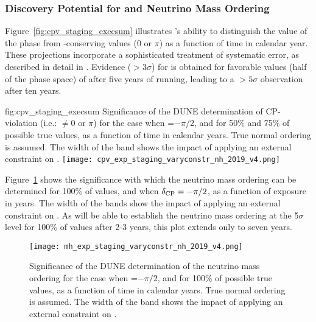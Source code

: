 \subsubsection{Discovery Potential for  and Neutrino 
Mass Ordering}

Figure~\ref{fig:cpv_staging_execsum} 
illustrates 's ability to distinguish 
the value of the  phase \deltacp from -conserving 
values (0 or $\pi$) as a function of time in calendar year.  
These projections incorporate a sophisticated treatment of systematic 
error, as described in detail in \physchlbl.  
Evidence ($>3\sigma$) for  is obtained for 
favorable values (half of the phase space) of \deltacp after five 
years of running, leading to a $>5\sigma$ %
observation after ten years.

\begin{dunefigure}{fig:cpv_staging_execsum}
{Significance of the DUNE determination of CP-violation (i.e.: \deltacp 
$\neq 0$ or $\pi$) for the case when \deltacp=$-\pi/2$, and for 50\% and 
75\% of possible true \deltacp values, as a function of time in calendar 
years. True normal ordering is assumed. The width of the band shows the 
impact of applying an external constraint on .}
\texttt{[image: cpv\_exp\_staging\_varyconstr\_nh\_2019\_v4.png]}
\end{dunefigure}

Figure~\ref{fig:mh_staging} shows the significance
with which the neutrino mass ordering can be determined for 100\% of \deltacp values, and when $\delta_{\rm CP}=-\pi/2$, as a function of exposure in years. The width of the bands show the impact of applying an external constraint on . As  will be able to establish the neutrino mass ordering at the 5$\sigma$ level for 100\% of \deltacp values after 2-3 years, this plot extends only to seven years.

\begin{figure}[h!]
    \centering
	\texttt{[image: mh\_exp\_staging\_varyconstr\_nh\_2019\_v4.png]}	
	\caption[Significance of the DUNE neutrino mass ordering determination, as a function of time]{Significance of the DUNE determination of the neutrino mass ordering for the case when \deltacp=$-\pi/2$, and for 100\% of possible true \deltacp values, as a function of time in calendar years. True normal ordering is assumed. The width of the band shows the impact of applying an external constraint on .}
    \label{fig:mh_staging}
\end{figure}

